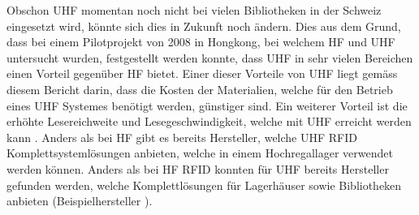 Obschon UHF momentan noch nicht bei vielen Bibliotheken in der Schweiz eingesetzt wird, könnte sich dies in Zukunft noch ändern. Dies aus dem Grund, dass bei einem Pilotprojekt von 2008 in Hongkong, bei welchem HF und UHF untersucht wurden, festgestellt werden konnte, dass UHF in sehr vielen Bereichen einen Vorteil gegenüber HF bietet. Einer dieser Vorteile von UHF liegt gemäss diesem Bericht darin, dass die Kosten der Materialien, welche für den Betrieb eines UHF Systemes benötigt werden, günstiger sind. Ein weiterer Vorteil ist die erhöhte Lesereichweite und Lesegeschwindigkeit, welche mit UHF erreicht werden kann \parencite{rfidHfVsUhf}. Anders als bei HF gibt es bereits Hersteller, welche UHF \gls{RFID} Komplettsystemlösungen anbieten, welche in einem Hochregallager verwendet werden können. Anders als bei HF \gls{RFID} konnten für UHF bereits Hersteller gefunden werden, welche Komplettlösungen für Lagerhäuser sowie Bibliotheken anbieten (Beispielhersteller \cite{litumRFID}).
